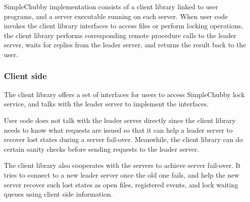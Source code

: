 %

SimpleChubby implementation consists of a client library linked to user programs,
and a server executable running on each server.
When user code invokes the client library interfaces to access files or perform locking operations,
the client library performs corresponding remote procedure calls to the leader server,
waits for replies from the leader server, and returns the result back to the user.

\subsubsection{Client side}
The client library offers a set of interfaces for users to access SimpleChubby lock service,
and talks with the leader server to implement the interfaces. 

User code does not talk with the leader server directly since the client library
needs to know what requests are issued so that it can help a leader server
to recover lost states during a server fail-over.
Meanwhile, the client library can do certain sanity checks before sending requests
to the leader server.

The client library also cooperates with the servers to achieve server fail-over.  
It tries to connect to a new leader server once the old one fails,
and help the new server recover such lost states
as open files, registered events, and lock waiting queues
using client side information.

